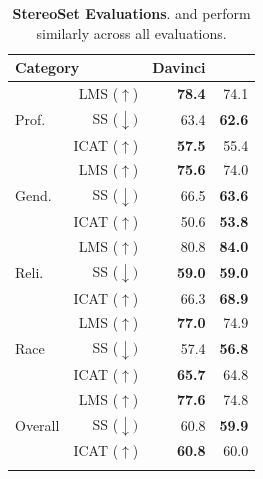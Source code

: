 \begin{table}[t]
    \centering
    \begin{tabular}{lrrr}
        \toprule
        \multicolumn{2}{l}{{\bf Category}} & {\bf Davinci} & {\bf \OPT{}} \\
        \midrule
        \multirow{3}{*}{Prof.}   & LMS ($\uparrow$)   & {\bf 78.4} & 74.1\\
                                 & SS  ($\downarrow)$ & {    63.4} & {\bf 62.6}\\
                                 & ICAT ($\uparrow$)  & {\bf 57.5} & 55.4\\

        \cmidrule(lr){1-4}             
        \multirow{3}{*}{Gend.}   & LMS ($\uparrow$)   & {\bf 75.6} & 74.0\\
                                 & SS  ($\downarrow)$ & {    66.5} & {\bf 63.6}\\
                                 & ICAT ($\uparrow$)  & {    50.6} & {\bf 53.8}\\

        \cmidrule(lr){1-4}             
        \multirow{3}{*}{Reli.}   & LMS ($\uparrow$)   & {    80.8} & {\bf 84.0}\\
                                 & SS  ($\downarrow)$ & {\bf 59.0} & {\bf 59.0}\\
                                 & ICAT ($\uparrow$)  & {    66.3} & {\bf 68.9}\\

        \cmidrule(lr){1-4}             
        \multirow{3}{*}{Race}    & LMS ($\uparrow$)   & {\bf 77.0} & 74.9\\
                                 & SS  ($\downarrow)$ & {    57.4} & {\bf 56.8}\\
                                 & ICAT ($\uparrow$)  & {\bf 65.7} & 64.8\\

        \cmidrule(lr){1-4}             
        \multirow{3}{*}{Overall} & LMS ($\uparrow$)   & {\bf 77.6} & 74.8\\
                                 & SS  ($\downarrow)$ & {    60.8} & {\bf 59.9}\\
                                 & ICAT ($\uparrow$)  & {\bf 60.8} & 60.0\\

        \tablewhitespace
        \bottomrule
    \end{tabular}
    \caption{{\bf StereoSet Evaluations}. \davinci{} and \OPT{} perform similarly across all evaluations.}
    \label{tab:stereoset}
\end{table}

